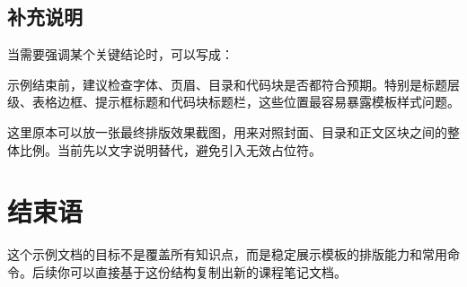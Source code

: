 \documentclass{computer-notes}
\begin{document}
\subsection{补充说明}
当需要强调某个关键结论时，可以写成：

示例结束前，建议检查字体、页眉、目录和代码块是否都符合预期。特别是标题层级、表格边框、提示框标题和代码块标题栏，这些位置最容易暴露模板样式问题。

这里原本可以放一张最终排版效果截图，用来对照封面、目录和正文区块之间的整体比例。当前先以文字说明替代，避免引入无效占位符。

\section{结束语}
这个示例文档的目标不是覆盖所有知识点，而是稳定展示模板的排版能力和常用命令。后续你可以直接基于这份结构复制出新的课程笔记文档。
\end{document}
